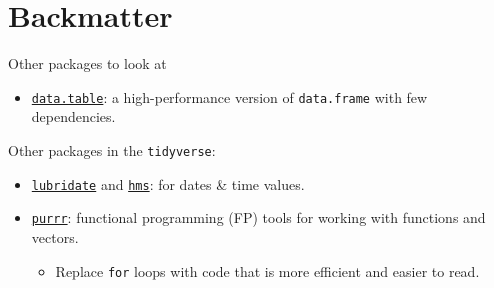 \documentclass[
  11pt,
  ignorenonframetext,
]{beamer}
\providecommand{\tightlist}{%
  \setlength{\itemsep}{0pt}\setlength{\parskip}{0pt}}
\begin{document}
\hypertarget{backmatter}{%
\section{Backmatter}\label{backmatter}}

\begin{frame}[fragile]{Other packages to look at}
\protect\hypertarget{other-packages-to-look-at}{}
\begin{itemize}
\tightlist
\item
  \href{https://rdatatable.gitlab.io/data.table/}{\texttt{data.table}}:
  a high-performance version of \texttt{data.frame} with few
  dependencies.
\end{itemize}

Other packages in the \texttt{tidyverse}:

\begin{itemize}
\item
  \href{https://lubridate.tidyverse.org/}{\texttt{lubridate}} and
  \href{https://hms.tidyverse.org/}{\texttt{hms}}: for dates \& time
  values.
\item
  \href{https://purrr.tidyverse.org/}{\texttt{purrr}}: functional
  programming (FP) tools for working with functions and vectors.

  \begin{itemize}
  \tightlist
  \item
    Replace \texttt{for} loops with code that is more efficient and
    easier to read.
  \end{itemize}
\end{itemize}
\end{frame}
\end{document}
